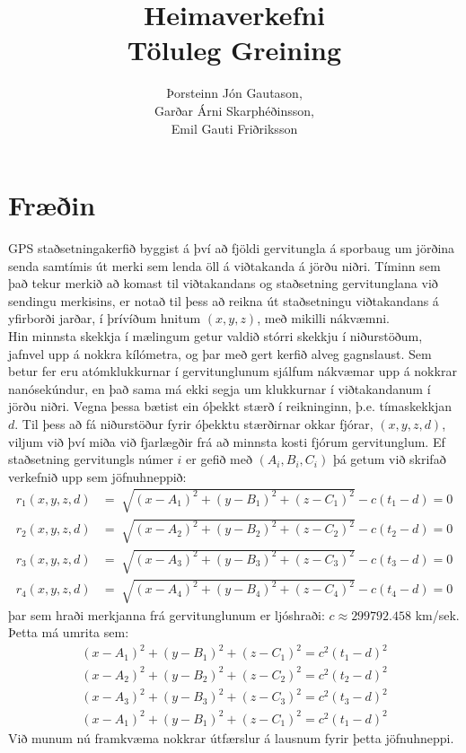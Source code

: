 \documentclass[11pt]{article}
\title{Heimaverkefni \\ \vspace{0.4cm} \large Töluleg Greining}
\author{ Þorsteinn Jón Gautason,\\ Garðar Árni Skarphéðinsson,\\
Emil Gauti Friðriksson}
\begin{document}
\maketitle
\newpage

\section*{Fræðin}
GPS staðsetningakerfið byggist á því að fjöldi gervitungla á sporbaug um jörðina senda samtímis út merki sem lenda öll á viðtakanda á jörðu niðri. Tíminn sem það tekur merkið að komast til viðtakandans og staðsetning gervitunglana við sendingu merkisins, er notað til þess að reikna út staðsetningu viðtakandans á yfirborði jarðar, í þrívíðum hnitum $(x,y,z)$, með mikilli nákvæmni.\\
Hin minnsta skekkja í mælingum getur valdið stórri skekkju í niðurstöðum, jafnvel upp á nokkra kílómetra, og þar með gert kerfið alveg gagnslaust. Sem betur fer eru atómklukkurnar í gervitunglunum sjálfum nákvæmar upp á nokkrar nanósekúndur, en það sama má ekki segja um klukkurnar í viðtakandanum í jörðu niðri. Vegna þessa bætist ein óþekkt stærð í reikninginn, þ.e. tímaskekkjan $d$. Til þess að fá niðurstöður fyrir óþekktu stærðirnar okkar fjórar, $(x,y,z,d)$, viljum við því miða við fjarlægðir frá að minnsta kosti fjórum gervitunglum. Ef staðsetning gervitungls númer $i$ er gefið með $(A_i, B_i, C_i)$ þá getum við skrifað verkefnið upp sem jöfnuhneppið:
\begin{align*}
r_1(x,y,z,d)&=\sqrt[]{(x-A_1)^2+(y-B_1)^2+(z-C_1)^2}-c(t_1-d)=0\\
r_2(x,y,z,d)&=\sqrt[]{(x-A_2)^2+(y-B_2)^2+(z-C_2)^2}-c(t_2-d)=0\\
r_3(x,y,z,d)&=\sqrt[]{(x-A_3)^2+(y-B_3)^2+(z-C_3)^2}-c(t_3-d)=0\\
r_4(x,y,z,d)&=\sqrt[]{(x-A_4)^2+(y-B_4)^2+(z-C_4)^2}-c(t_4-d)=0
\end{align*}
þar sem hraði merkjanna frá gervitunglunum er ljóshraði: $c\approx299792.458$ km/sek. 
\\
Þetta má umrita sem:
\begin{align*}
(x-A_1)^2+(y-B_1)^2+(z-C_1)^2=c^2(t_1-d)^2\\
(x-A_2)^2+(y-B_2)^2+(z-C_2)^2=c^2(t_2-d)^2\\
(x-A_3)^2+(y-B_3)^2+(z-C_3)^2=c^2(t_3-d)^2\\
(x-A_1)^2+(y-B_1)^2+(z-C_1)^2=c^2(t_1-d)^2
\end{align*}
Við munum nú framkvæma nokkrar útfærslur á lausnum fyrir þetta jöfnuhneppi.
\newpage
\end{document}

